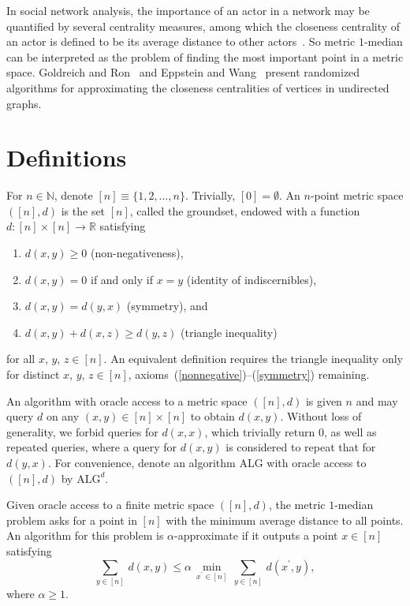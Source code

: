 \documentclass[letterpaper,12pt]{article}
\begin{document}
In social network analysis,
the importance of an actor in a network
may
be
quantified by
several
centrality measures, among which the closeness centrality of an actor is
defined to be
its average distance to other actors~\cite{WF94}.
So
{\sc metric $1$-median}
can
be interpreted as the problem of finding the
most important point in a metric space.
Goldreich and Ron~\cite{GR08} and Eppstein and Wang~\cite{EW04} present
randomized algorithms for approximating the closeness centralities of
vertices in undirected graphs.



\section{Definitions}\label{definitionssection}

For $n\in\mathbb{N}$,
denote
$[n]\equiv \{1,2,\ldots,n\}$.
Trivially, $[0]=\emptyset$.
An $n$-point metric space $([n],d)$ is the set $[n]$, called the groundset,
endowed with a function
$d\colon [n]\times[n]\to\mathbb{R}$ satisfying
\begin{enumerate}[(1)]
\item\label{nonnegative}
$d(x,y)\ge 0$ (non-negativeness),
\item
$d(x,y)=0$ if and only if $x=y$ (identity of indiscernibles),
\item\label{symmetry}
$d(x,y)=d(y,x)$ (symmetry), and
\item
$d(x,y)+d(x,z)\ge d(y,z)$ (triangle inequality)
\end{enumerate}
for all $x$, $y$, $z\in [n]$.
An
equivalent definition
requires the triangle inequality only for distinct
$x$, $y$, $z\in [n]$, axioms~(\ref{nonnegative})--(\ref{symmetry}) remaining.




An algorithm with oracle access to a metric space $([n],d)$
is given $n$ and may query
$d$ on
any
$(x,y)\in[n]\times[n]$ to obtain $d(x,y)$.
Without loss of generality,
we
forbid
queries for $d(x,x)$, which trivially return $0$,
as well as repeated queries, where
a query
for $d(x,y)$
is considered to repeat that for
$d(y,x)$.
For convenience,
denote
an algorithm ALG with oracle access to $([n],d)$
by $\text{ALG}^d$.

Given oracle access to a finite metric space $([n],d)$, the
{\sc metric $1$-median} problem asks for a point
in
$[n]$
with the minimum average distance to
all
points.
An algorithm for
this problem is
$\alpha$-approximate if
it outputs
a point $x\in[n]$
satisfying
$$\sum_{y\in[n]}\,d\left(x,y\right)
\le\alpha\,\min_{x^\prime\in[n]}\,\sum_{y\in[n]}\,d\left(x^\prime,y\right),$$
where
$\alpha\ge 1$.
\end{document}
